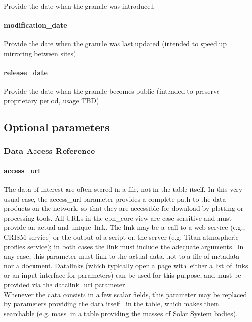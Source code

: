 \documentclass[11pt,a4paper]{ivoa}
\begin{document}
Provide the date when the granule was introduced

\paragraph{modification\_date}

Provide the date when the granule was last updated (intended to speed up mirroring between sites)

\paragraph{release\_date}

Provide the date when the granule becomes public (intended to preserve proprietary period, usage TBD)

\subsection{Optional parameters}

\subsubsection{Data Access Reference}

\paragraph{access\_url}

The data of interest are often stored in a file, not in the table itself. In this very usual case, the access\_url parameter provides a complete path to the data products on the network, so that they are accessible for download by plotting or processing tools. All URLs in the epn\_core view are case sensitive and must provide an actual and unique link. The link may be a call to a web service (e.g., CRISM service) or the output of a script on the server (e.g. Titan atmospheric profiles service); in both cases the link must include the adequate arguments. In any case, this parameter must link to the actual data, not to a file of metadata nor a document. Datalinks (which typically open a page with either a list of links or an input interface for parameters) can be used for this purpose, and must be provided via the datalink\_url parameter. \\Whenever the data consists in a few scalar fields, this parameter may be replaced by parameters providing the data itself  in the table, which makes them searchable (e.g. mass, in a table providing the masses of Solar System bodies).
\end{document}
